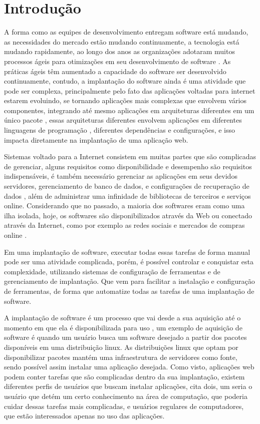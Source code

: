\chapter{Introdução}
\label{cap-introducao}

A forma como as equipes de desenvolvimento entregam software está mudando, as
necessidades do mercado estão mudando continuamente, a tecnologia está mudando
rapidamente, ao longo dos anos as organizações adotaram muitos processos ágeis para
otimizações em seu desenvolvimento de software \cite{7173368}. As práticas ágeis
têm aumentado a capacidade do software ser desenvolvido continuamente, contudo,
a implantação do software ainda é uma atividade que pode ser complexa, principalmente
pelo fato das aplicações voltadas para internet estarem evoluindo, se tornando
aplicações mais complexas que envolvem vários componentes, integrando até mesmo
aplicações em arquiteturas diferentes em um único pacote \cite{6265084}, essas
arquiteturas diferentes envolvem aplicações em diferentes linguagens de programação
, diferentes dependências e configurações, e isso impacta diretamente na implantação
 de uma aplicação web.

Sistemas voltado para a Internet consistem em muitas partes que são complicadas
de gerenciar, alguns requisitos como disponibilidade e desempenho são requisitos
indispensáveis, é também necessário gerenciar as aplicações em seus devidos
servidores, gerenciamento de banco de dados, e configurações de recuperação de dados
, além de administrar uma infinidade de bibliotecas de terceiros e serviços online.
 Considerando que no passado, a maioria dos softwares eram como uma ilha isolada,
hoje, os softwares são disponibilizados através da Web ou conectado através da Internet,
como por exemplo as redes sociais e mercados de compras online \cite{6265084}.

Em uma implantação de software, executar todas essas tarefas de forma manual pode ser
uma atividade complicada, porém, é possível controlar e conquistar
esta complexidade, utilizando sistemas de configuração de ferramentas e de
gerenciamento de implantação. Que vem para facilitar a instalação e configuração de ferramentas,
de forma que automatize todas as tarefas de uma implantação de software.

A implantação de software é um processo que vai desde a sua aquisição até o momento
em que ela é disponibilizada para uso \cite{OMG06}, um exemplo de aquisição de software
é quando um usuário busca um software desejado a partir dos pacotes disponíveis em uma
distribuição linux. As distribuições linux que optam por disponibilizar
pacotes mantém uma infraestrutura de servidores como fonte, sendo possível assim
instalar uma aplicação desejada. Como visto, aplicações web podem conter tarefas
que são complicadas dentro da sua implantação, existem diferentes perfis de
usuários que buscam instalar aplicações, \cite{araujo2011apprecommender} cita dois,
um seria o usuário que detém um certo conhecimento na área de computação, que
poderia cuidar dessas tarefas mais complicadas, e usuários regulares de computadores,
que estão interessados apenas no uso das aplicações.

